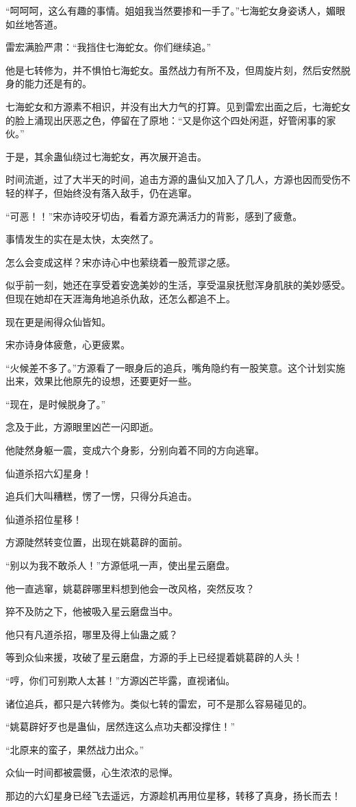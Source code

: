 \begin{this_body}
“呵呵呵，这么有趣的事情。姐姐我当然要掺和一手了。”七海蛇女身姿诱人，媚眼如丝地答道。

雷宏满脸严肃：“我挡住七海蛇女。你们继续追。”

他是七转修为，并不惧怕七海蛇女。虽然战力有所不及，但周旋片刻，然后安然脱身的能力还是有的。

七海蛇女和方源素不相识，并没有出大力气的打算。见到雷宏出面之后，七海蛇女的脸上涌现出厌恶之色，停留在了原地：“又是你这个四处闲逛，好管闲事的家伙。”

于是，其余蛊仙绕过七海蛇女，再次展开追击。

时间流逝，过了大半天的时间，追击方源的蛊仙又加入了几人，方源也因而受伤不轻的样子，但始终没有落入敌手，仍在逃窜。

“可恶！！”宋亦诗咬牙切齿，看着方源充满活力的背影，感到了疲惫。

事情发生的实在是太快，太突然了。

怎么会变成这样？宋亦诗心中也萦绕着一股荒谬之感。

似乎前一刻，她还在享受着安逸美妙的生活，享受温泉抚慰浑身肌肤的美妙感受。但现在她却在天涯海角地追杀仇敌，还怎么都追不上。

现在更是闹得众仙皆知。

宋亦诗身体疲惫，心更疲累。

“火候差不多了。”方源看了一眼身后的追兵，嘴角隐约有一股笑意。这个计划实施出来，效果比他原先的设想，还要更好一些。

“现在，是时候脱身了。”

念及于此，方源眼里凶芒一闪即逝。

他陡然身躯一震，变成六个身影，分别向着不同的方向逃窜。

仙道杀招六幻星身！

追兵们大叫糟糕，愣了一愣，只得分兵追击。

仙道杀招位星移！

方源陡然转变位置，出现在姚葛辟的面前。

“别以为我不敢杀人！”方源低吼一声，使出星云磨盘。

他一直逃窜，姚葛辟哪里料想到他会一改风格，突然反攻？

猝不及防之下，他被吸入星云磨盘当中。

他只有凡道杀招，哪里及得上仙蛊之威？

等到众仙来援，攻破了星云磨盘，方源的手上已经提着姚葛辟的人头！

“哼，你们可别欺人太甚！”方源凶芒毕露，直视诸仙。

诸位追兵，都只是六转修为。类似七转的雷宏，可不是那么容易碰见的。

“姚葛辟好歹也是蛊仙，居然连这么点功夫都没撑住！”

“北原来的蛮子，果然战力出众。”

众仙一时间都被震慑，心生浓浓的忌惮。

那边的六幻星身已经飞去遥远，方源趁机再用位星移，转移了真身，扬长而去！

\end{this_body}

